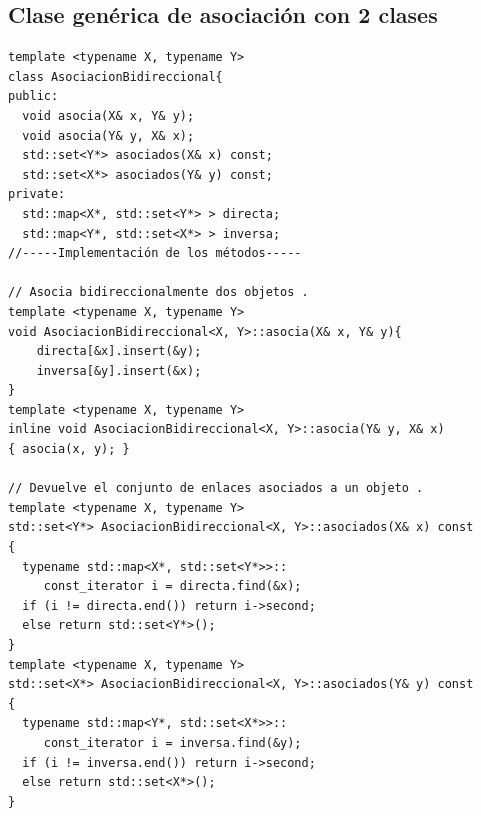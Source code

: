 \subsection{Clase genérica de asociación con 2 clases}
\begin{lstlisting}[frame=single]
template <typename X, typename Y>
class AsociacionBidireccional{
public:
  void asocia(X& x, Y& y);
  void asocia(Y& y, X& x);
  std::set<Y*> asociados(X& x) const;
  std::set<X*> asociados(Y& y) const;
private:
  std::map<X*, std::set<Y*> > directa;
  std::map<Y*, std::set<X*> > inversa;
//-----Implementación de los métodos-----

// Asocia bidireccionalmente dos objetos .
template <typename X, typename Y>
void AsociacionBidireccional<X, Y>::asocia(X& x, Y& y){
    directa[&x].insert(&y);
    inversa[&y].insert(&x);
}
template <typename X, typename Y>
inline void AsociacionBidireccional<X, Y>::asocia(Y& y, X& x)
{ asocia(x, y); }

// Devuelve el conjunto de enlaces asociados a un objeto .
template <typename X, typename Y>
std::set<Y*> AsociacionBidireccional<X, Y>::asociados(X& x) const
{
  typename std::map<X*, std::set<Y*>>::
     const_iterator i = directa.find(&x);
  if (i != directa.end()) return i->second;
  else return std::set<Y*>();
}
template <typename X, typename Y>
std::set<X*> AsociacionBidireccional<X, Y>::asociados(Y& y) const
{
  typename std::map<Y*, std::set<X*>>::
     const_iterator i = inversa.find(&y);
  if (i != inversa.end()) return i->second;
  else return std::set<X*>();
}
\end{lstlisting}
\newpage
